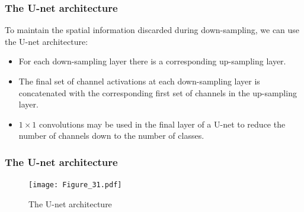 \documentclass{beamer}
\begin{document}
\begin{frame}
    \frametitle{The U-net architecture}
    To maintain the spatial information discarded during down-sampling, we can use the U-net architecture:
    \begin{itemize}
        \item For each down-sampling layer there is a corresponding up-sampling layer.
        \item The final set of channel activations at each down-sampling layer is concatenated with the corresponding first set of channels in the up-sampling layer.
        \item $1\times{}1$ convolutions may be used in the final layer of a U-net to reduce the number of channels down to the number of classes.
    \end{itemize}
\end{frame}

\begin{frame}
    \frametitle{The U-net architecture}
    \begin{figure}
        \caption{The U-net architecture}
        \texttt{[image: Figure\_31.pdf]}
    \end{figure}
\end{frame}
\end{document}
